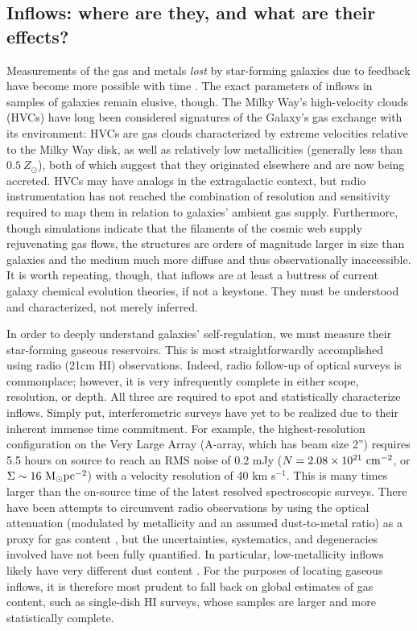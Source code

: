 \subsection{Inflows: where are they, and what are their effects?}

Measurements of the gas and metals \textit{lost} by star-forming galaxies due to feedback have become more possible with time \citep{telford_19_m31-metal-loss, chisholm_18_outflows, belfiore_vincenzo_maiolino_19}. The exact parameters of inflows in samples of galaxies remain elusive, though. The Milky Way's high-velocity clouds (HVCs) have long been considered signatures of the Galaxy's gas exchange with its environment: HVCs are gas clouds characterized by extreme velocities relative to the Milky Way disk, as well as relatively low metallicities (generally less than $0.5 ~ Z_{\odot}$), both of which suggest that they originated elsewhere and are now being accreted. HVCs may have analogs in the extragalactic context, but radio instrumentation has not reached the combination of resolution and sensitivity required to map them in relation to galaxies' ambient gas supply. Furthermore, though simulations indicate that the filaments of the cosmic web supply rejuvenating gas flows, the structures are orders of magnitude larger in size than galaxies and the medium much more diffuse and thus observationally inaccessible. It is worth repeating, though, that inflows are at least a buttress of current galaxy chemical evolution theories, if not a keystone. They must be understood and characterized, not merely inferred.

In order to deeply understand galaxies' self-regulation, we must measure their star-forming gaseous reservoirs. This is most straightforwardly accomplished using radio (21cm HI) observations. Indeed, radio follow-up of optical surveys is commonplace; however, it is very infrequently complete in either scope, resolution, or depth. All three are required to spot and statistically characterize inflows. Simply put, interferometric surveys have yet to be realized due to their inherent immense time commitment. For example, the highest-resolution configuration on the Very Large Array (A-array, which has beam size 2'') requires 5.5 hours on source to reach an RMS noise of 0.2 mJy ($N = 2.08 \times 10^{21} ~ {\rm cm^{-2}}$, or $\Sigma \sim  16 ~ {\rm M_{\odot} pc^{-2}}$) with a velocity resolution of 40 km s$^{-1}$. This is many times larger than the on-source time of the latest resolved spectroscopic surveys. There have been attempts to circumvent radio observations by using the optical attenuation (modulated by metallicity and an assumed dust-to-metal ratio) as a proxy for gas content \citep{brinchmann_13,carton_brinchmann_2017, barrera-ballesteros_20_edge-califa}, but the uncertainties, systematics, and degeneracies involved have not been fully quantified. In particular, low-metallicity inflows likely have very different dust content \citep{kahre_walterbos_2018_legus_dusttogas}. For the purposes of locating gaseous inflows, it is therefore most prudent to fall back on global estimates of gas content, such as single-dish HI surveys, whose samples are larger and more statistically complete.

